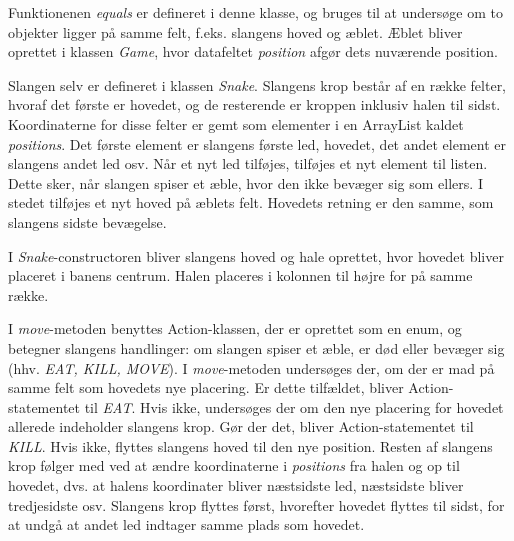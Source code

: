 \documentclass{report}
\begin{document}
Funktionenen \textit{equals} er defineret i denne klasse, og bruges til at undersøge om to objekter ligger på samme felt, f.eks. slangens hoved og æblet. Æblet bliver oprettet i klassen \textit{Game}, hvor datafeltet \textit{position} afgør dets nuværende position.

Slangen selv er defineret i klassen \textit{Snake}. Slangens krop består af en række felter, hvoraf det første er hovedet, og de resterende er kroppen inklusiv halen til sidst. Koordinaterne for disse felter er gemt som elementer i en ArrayList kaldet \textit{positions}. Det første element er slangens første led, hovedet, det andet element er slangens andet led osv. Når et nyt led tilføjes, tilføjes et nyt element til listen. Dette sker, når slangen spiser et æble, hvor den ikke bevæger sig som ellers. I stedet tilføjes et nyt hoved på æblets felt. Hovedets retning er den samme, som slangens sidste bevægelse.

I \textit{Snake}-constructoren bliver slangens hoved og hale oprettet, hvor hovedet bliver placeret i banens centrum. Halen placeres i kolonnen til højre for på samme række.

I \textit{move}-metoden benyttes Action-klassen, der er oprettet som en enum, og betegner slangens handlinger: om slangen spiser et æble, er død eller bevæger sig (hhv. \textit{EAT, KILL, MOVE}). I \textit{move}-metoden undersøges der, om der er mad på samme felt som hovedets nye placering. Er dette tilfældet, bliver Action-statementet til \textit{EAT}. Hvis ikke, undersøges der om den nye placering for hovedet allerede indeholder slangens krop. Gør der det, bliver Action-statementet til \textit{KILL}. Hvis ikke, flyttes slangens hoved til den nye position. Resten af slangens krop følger med ved at ændre koordinaterne i \textit{positions} fra halen og op til hovedet, dvs. at halens koordinater bliver næstsidste led, næstsidste bliver tredjesidste osv. Slangens krop flyttes først, hvorefter hovedet flyttes til sidst, for at undgå at andet led indtager samme plads som hovedet.
\end{document}
